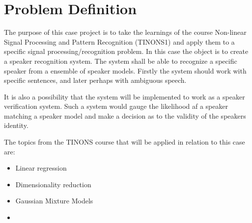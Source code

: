\documentclass[Main]{subfiles}
\begin{document}
\chapter{Problem Definition}
The purpose of this case project is to take the learnings of the course Non-linear Signal Processing and Pattern Recognition (TINONS1) and apply them to a specific signal processing/recognition problem.
In this case the object is to create a speaker recognition system.
The system shall be able to recognize a specific speaker from a ensemble of speaker models.
Firstly the system should work with specific sentences, and later perhaps with ambiguous speech.

It is also a possibility that the system will be implemented to work as a speaker verification system.
Such a system would gauge the likelihood af a speaker matching a speaker model and make a decision as to the validity of the speakers identity.

The topics from the TINONS course that will be applied in relation to this case are:
\begin{itemize}
\item Linear regression 

\item Dimensionality reduction

\item Gaussian Mixture Models

\item {}

\end{itemize}
\end{document}
